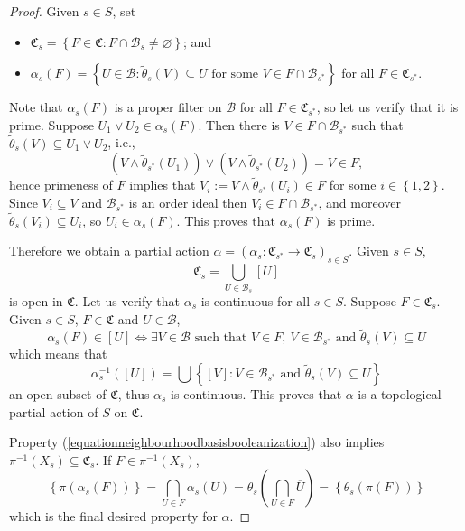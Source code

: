 \begin{proof}
Given $s\in S$, set
\begin{itemize}
\item $\mathfrak{C}_s=\left\{F\in\mathfrak{C}:F\cap\mathcal{B}_s\neq\varnothing\right\}$; and
\item $\alpha_s(F)=\left\{U\in\mathcal{B}:\widetilde{\theta}_s(V)\subseteq U\text{ for some }V\in F\cap\mathcal{B}_{s^*}\right\}$ for all $F\in\mathfrak{C}_{s^*}$.
\end{itemize}
Note that $\alpha_s(F)$ is a proper filter on $\mathcal{B}$ for all $F\in\mathfrak{C}_{s^*}$, so let us verify that it is prime. Suppose $U_1\lor U_2\in\alpha_s(F)$. Then there is $V\in F\cap\mathcal{B}_{s^*}$ such that $\widetilde{\theta}_s(V)\subseteq U_1\lor U_2$, i.e.,
\[(V\land\widetilde{\theta}_{s^*}(U_1))\lor(V\land\widetilde{\theta}_{s^*}(U_2))=V\in F,\]
hence primeness of $F$ implies that $V_i:=V\land\widetilde{\theta}_{s^*}(U_i)\in F$ for some $i\in\left\{1,2\right\}$. Since $V_i\subseteq V$ and $\mathcal{B}_{s^*}$ is an order ideal then $V_i\in F\cap\mathcal{B}_{s^*}$, and moreover $\widetilde{\theta}_s(V_i)\subseteq U_i$, so $U_i\in\alpha_s(F)$. This proves that $\alpha_s(F)$ is prime.

Therefore we obtain a partial action $\alpha=\left(\alpha_s:\mathfrak{C}_{s^*}\to\mathfrak{C}_s\right)_{s\in S}$. Given $s\in S$,
\[\mathfrak{C}_s=\bigcup_{U\in\mathcal{B}_s}[U]\]
is open in $\mathfrak{C}$. Let us verify that $\alpha_s$ is continuous for all $s\in S$. Suppose $F\in\mathfrak{C}_s$. Given $s\in S$, $F\in\mathfrak{C}$ and $U\in\mathcal{B}$,
\[\alpha_s(F)\in[U]\iff \exists V\in\mathcal{B}\text{ such that }V\in F,\ V\in\mathcal{B}_{s^*}\text{ and }\widetilde{\theta}_s(V)\subseteq U\]
which means that
\[\alpha_s^{-1}([U])=\bigcup\left\{[V]:V\in\mathcal{B}_{s^*}\text{ and }\widetilde{\theta}_s(V)\subseteq U\right\}\]
an open subset of $\mathfrak{C}$, thus $\alpha_s$ is continuous. This proves that $\alpha$ is a topological partial action of $S$ on $\mathfrak{C}$.

Property (\ref{equationneighbourhoodbasisbooleanization}) also implies $\pi^{-1}(X_s)\subseteq\mathfrak{C}_s$. If $F\in\pi^{-1}(X_s)$,
\[\left\{\pi(\alpha_s(F))\right\}=\bigcap_{U\in F}\overline{\alpha_s(U)}=\theta_s\left(\bigcap_{U\in F}\overline{U}\right)=\left\{\theta_s(\pi(F))\right\}\]
which is the final desired property for $\alpha$.\qedhere
\end{proof}


